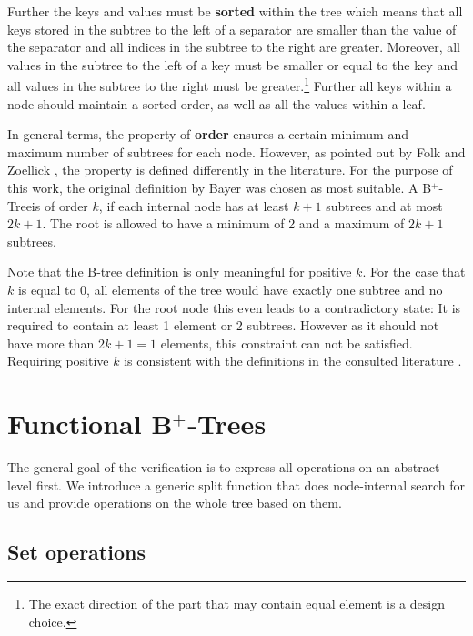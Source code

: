 \documentclass[a4paper,UKenglish,cleveref, autoref, thm-restate]{lipics-v2021}
\newcommand{\btree}{B$^+$-Tree}
\newcommand{\btrees}{B$^+$-Trees}
\begin{document}
Further the keys and values must be \textbf{sorted} within the tree which means that all keys stored
in the subtree to the left of a separator are smaller than the value of the separator
and all indices in the subtree to the right are greater.
Moreover, all values in the subtree to the left of a key must be smaller or equal
to the key and all values in the subtree to the right must be greater.\footnote{
    The exact direction of the part that may contain equal element is a design choice.
}
Further all keys within a node should maintain a sorted order,
as well as all the values within a leaf.

In general terms, the property of \textbf{order} ensures a certain minimum and maximum
number of subtrees for each node.
However, as pointed out by Folk and Zoellick \cite{DBLP:books/daglib/0095349_mod},
the property is defined differently in the literature.
For the purpose of this work, the original definition by Bayer
was chosen as most suitable.
A \btree is of order $k$, if each internal node has at least $k+1$
subtrees and at most $2k+1$.
The root is allowed to have a minimum of 2 and a maximum of $2k+1$ subtrees.

Note that the B-tree definition is only meaningful for positive $k$.
For the case that $k$ is equal to 0,
all elements of the tree would have exactly one subtree
and no internal elements.
For the root node this even leads to a contradictory state:
It is required to contain at least 1 element or 2 subtrees.
However as it should not have more than $2k+1 = 1$ elements,
this constraint can not be satisfied.
Requiring positive $k$ is consistent with the definitions
in the consulted literature \cite{DBLP:journals/acta/BayerM72,DBLP:journals/csur/Comer79,DBLP:books/daglib/0023376}.

\section{Functional \btrees}
\label{sec:functional}

The general goal of the verification is to express
all operations on an abstract level first.
We introduce a generic split function that does node-internal search
for us and provide operations on the whole tree based on them.

\subsection{Set operations}
\label{sec:functional_set}
\end{document}
